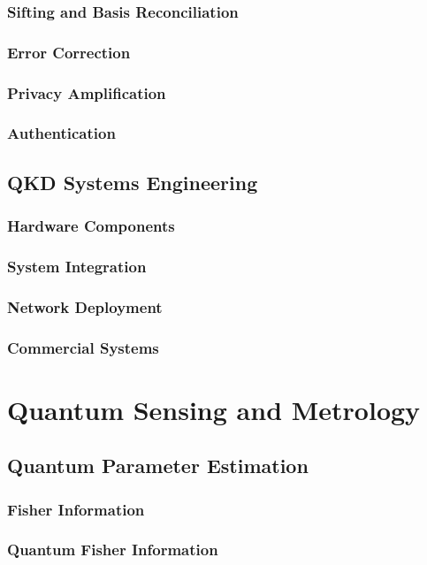 \documentclass[12pt,a4paper]{book}
\begin{document}
\subsection{Sifting and Basis Reconciliation}
\subsection{Error Correction}
\subsection{Privacy Amplification}
\subsection{Authentication}

\section{QKD Systems Engineering}
\subsection{Hardware Components}
\subsection{System Integration}
\subsection{Network Deployment}
\subsection{Commercial Systems}

\chapter{Quantum Sensing and Metrology}

\section{Quantum Parameter Estimation}
\subsection{Fisher Information}
\subsection{Quantum Fisher Information}
\end{document}
